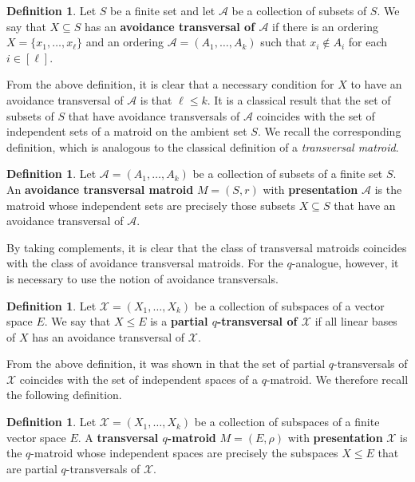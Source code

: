 \documentclass{article}
\theoremstyle{definition}
\newtheorem{definition}[theorem]{{{Definition}}}
\begin{document}
\begin{definition}
    Let $S$ be a finite set and let $\mathcal{A}$ be a collection of subsets of $S$. We say that $X\subseteq S$ has an \textbf{avoidance transversal of $\mathcal{A}$} if there is an ordering $X=\{x_1,\dots,x_\ell\}$ and an ordering $\mathcal{A}=(A_1,\dots,A_k)$ such that $x_i\notin A_i$ for each $i\in[\ell]$.
\end{definition}

From the above definition, it is clear that a necessary condition for $X$ to have an avoidance transversal of $\mathcal{A}$ is that $\ell\leq k$. It is a classical result that the set of subsets of $S$ that have avoidance transversals of $\mathcal{A}$ coincides with the set of independent sets of a matroid on the ambient set $S$. We recall the corresponding definition, which is analogous to the classical definition of a \emph{transversal matroid}.

\begin{definition}
    Let $\mathcal{A}=(A_1,\dots,A_k)$ be a collection of subsets of a finite set $S$. An \textbf{avoidance transversal matroid} $M=(S,r)$ with \textbf{presentation} $\mathcal{A}$ is the matroid whose independent sets are precisely those subsets $X\subseteq S$ that have an avoidance transversal of $\mathcal{A}$.
\end{definition}

By taking complements, it is clear that the class of transversal matroids coincides with the class of avoidance transversal matroids. For the $q$-analogue, however, it is necessary to use the notion of avoidance transversals.

\begin{definition}\cite{saaltink2025theoryqtransversals}
    Let $\mathcal{X}=(X_1,\dots,X_k)$ be a collection of subspaces of a vector space $E$. We say that $X\leq E$ is a \textbf{partial $q$-transversal of $\mathcal{X}$} if all linear bases of $X$ has an avoidance transversal of $\mathcal{X}$.
\end{definition}

From the above definition, it was shown in \cite{saaltink2025theoryqtransversals} that the set of partial $q$-transversals of $\mathcal{X}$ coincides with the set of independent spaces of a $q$-matroid. We therefore recall the following definition.

\begin{definition}\cite{saaltink2025theoryqtransversals}
    Let $\mathcal{X}=(X_1,\dots,X_k)$ be a collection of subspaces of a finite vector space $E$. A \textbf{transversal $q$-matroid} $M=(E,\rho)$ with \textbf{presentation} $\mathcal{X}$ is the $q$-matroid whose independent spaces are precisely the subspaces $X\leq E$ that are partial $q$-transversals of $\mathcal{X}$.
\end{definition}
\end{document}
